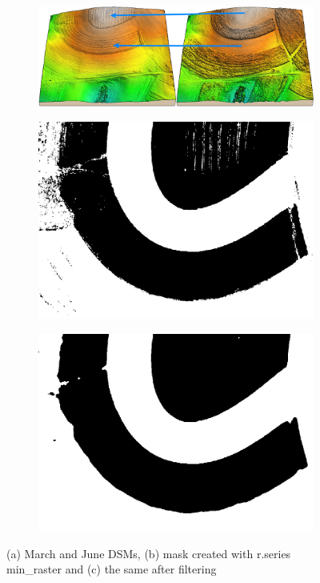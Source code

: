 \documentclass[a4paper,10pt]{article}
\begin{document}
 \begin{figure}
	\centering
	\begin{subfigure}[b]{0.49\textwidth}
 		\includegraphics[width=\textwidth]{img/march}
 		\caption{\label{fig:march}}
	\end{subfigure}\hfill%
	\begin{subfigure}[b]{0.25\textwidth}
 		\includegraphics[width=\textwidth]{img/mask}
 		\caption{}
	\end{subfigure}\hfill%
	\begin{subfigure}[b]{0.25\textwidth}
 		\includegraphics[width=\textwidth]{img/mask_sm}
 		\caption{}
	\end{subfigure}\hfill%
	\caption{(a) March and June DSMs, (b) mask created with r.series min\_raster and (c) the same after filtering}
	\label{fig:march_mask}
\end{figure}
\end{document}
